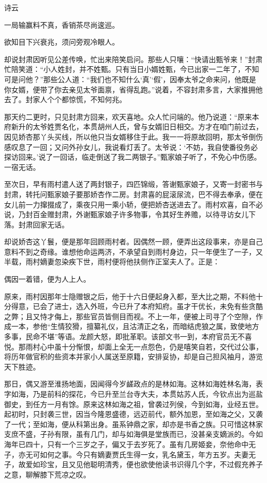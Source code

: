 
诗云

一局输赢料不真，香销茶尽尚逡巡。

欲知目下兴衰兆，须问旁观冷眼人。

却说封肃因听见公差传唤，忙出来陪笑启问。那些人只嚷：“快请出甄爷来！”封肃忙陪笑道：“小人姓封，并不姓甄。只有当日小婿姓甄，今已出家一二年了，不知可是问他？”那些公人道：“我们也不知什么‘真’‘假’，因奉太爷之命来问，他既是你女婿，便带了你去亲见太爷面禀，省得乱跑。”说着，不容封肃多言，大家推拥他去了。封家人个个都惊慌，不知何兆。

那天约二更时，只见封肃方回来，欢天喜地。众人忙问端的。他乃说道：“原来本府新升的太爷姓贾名化，本贯胡州人氏，曾与女婿旧日相交。方才在咱门前过去，因见娇杏那丫头买线，所以他只当女婿移住于此。我一一将原故回明，那太爷倒伤感叹息了一回；又问外孙女儿，我说看灯丢了。太爷说：‘不妨，我自使番役务必探访回来。’说了一回话，临走倒送了我二两银子。”甄家娘子听了，不免心中伤感。一宿无话。

至次日，早有雨村遣人送了两封银子，四匹锦缎，答谢甄家娘子，又寄一封密书与封肃，转托问甄家娘子要那娇杏作二房。封肃喜的屁滚尿流，巴不得去奉承，便在女儿前一力撺掇成了，乘夜只用一乘小轿，便把娇杏送进去了。雨村欢喜，自不必说，乃封百金赠封肃，外谢甄家娘子许多物事，令其好生养赡，以待寻访女儿下落。封肃回家无话。

却说娇杏这丫鬟，便是那年回顾雨村者。因偶然一顾，便弄出这段事来，亦是自己意料不到之奇缘。谁想他命运两济，不承望自到雨村身边，只一年便生了一子，又半载，雨村嫡妻忽染疾下世，雨村便将他扶侧作正室夫人了。正是：

偶因一着错，便为人上人。

原来，雨村因那年士隐赠银之后，他于十六日便起身入都，至大比之期，不料他十分得意，已会了进士，选入外班，今已升了本府知府。虽才干优长，未免有些贪酷之弊；且又恃才侮上，那些官员皆侧目而视。不上一年，便被上司寻了个空隙，作成一本，参他“生情狡猾，擅纂礼仪，且沽清正之名，而暗结虎狼之属，致使地方多事，民命不堪”等语。龙颜大怒，即批革职。该部文书一到，本府官员无不喜悦。那雨村心中虽十分惭恨，却面上全无一点怨色，仍是嘻笑自若，交代过公事，将历年做官积的些资本并家小人属送至原籍，安排妥协，却是自己担风袖月，游览天下胜迹。

那日，偶又游至淮扬地面，因闻得今岁鹾政点的是林如海。这林如海姓林名海，表字如海，乃是前科的探花，今已升至兰台寺大夫，本贯姑苏人氏，今钦点出为巡盐御史，到任方一月有馀。原来这林如海之祖，曾袭过列侯，今到如海，业经五世。起初时，只封袭三世，因当今隆恩盛德，远迈前代，额外加恩，至如海之父，又袭了一代；至如海，便从科第出身。虽系钟鼎之家，却亦是书香之族。只可惜这林家支庶不盛，子孙有限，虽有几门，却与如海俱是堂族而已，没甚亲支嫡派的。今如海年已四十，只有一个三岁之子，偏又于去岁死了。虽有几房姬妾，奈他命中无子，亦无可如何之事。今只有嫡妻贾氏生得一女，乳名黛玉，年方五岁。夫妻无子，故爱如珍宝，且又见他聪明清秀，便也欲使他读书识得几个字，不过假充养子之意，聊解膝下荒凉之叹。

